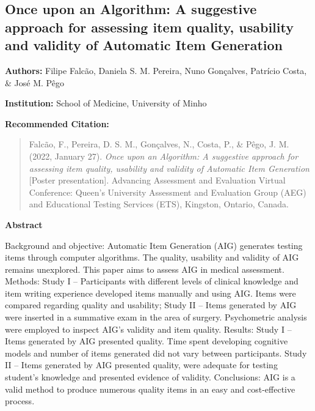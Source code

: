 \documentclass[
]{book}
\begin{document}
\newpage

\hypertarget{once-upon-an-algorithm-a-suggestive-approach-for-assessing-item-quality-usability-and-validity-of-automatic-item-generation}{%
\subsection{Once upon an Algorithm: A suggestive approach for assessing item quality, usability and validity of Automatic Item Generation}\label{once-upon-an-algorithm-a-suggestive-approach-for-assessing-item-quality-usability-and-validity-of-automatic-item-generation}}

\textbf{Authors:} Filipe Falcão, Daniela S. M. Pereira, Nuno Gonçalves, Patrício Costa, \& José M. Pêgo

\textbf{Institution:} School of Medicine, University of Minho

\textbf{Recommended Citation:}

\begin{quote}
Falcão, F., Pereira, D. S. M., Gonçalves, N., Costa, P., \& Pêgo, J. M. (2022, January 27). \emph{Once upon an Algorithm: A suggestive approach for assessing item quality, usability and validity of Automatic Item Generation} {[}Poster presentation{]}. Advancing Assessment and Evaluation Virtual Conference: Queen's University Assessment and Evaluation Group (AEG) and Educational Testing Services (ETS), Kingston, Ontario, Canada.
\end{quote}

\textbf{Abstract}

Background and objective: Automatic Item Generation (AIG) generates testing items through computer algorithms. The quality, usability and validity of AIG remains unexplored. This paper aims to assess AIG in medical assessment. Methods: Study I -- Participants with different levels of clinical knowledge and item writing experience developed items manually and using AIG. Items were compared regarding quality and usability; Study II -- Items generated by AIG were inserted in a summative exam in the area of surgery. Psychometric analysis were employed to inspect AIG's validity and item quality. Results: Study I -- Items generated by AIG presented quality. Time spent developing cognitive models and number of items generated did not vary between participants. Study II -- Items generated by AIG presented quality, were adequate for testing student's knowledge and presented evidence of validity. Conclusions: AIG is a valid method to produce numerous quality items in an easy and cost-effective process.
\end{document}
